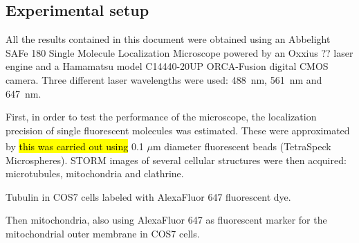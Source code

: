 \subsection{Experimental setup} \label{sec:experimental_setup}
All the results contained in this document were obtained using an Abbelight SAFe 180 Single Molecule Localization Microscope powered by an Oxxius ?? laser engine and a Hamamatsu model C14440-20UP ORCA-Fusion digital CMOS camera.
Three different laser wavelengths were used: \mbox{488 nm}, \mbox{561 nm} and \mbox{647 nm}.

First, in order to test the performance of the microscope, the localization precision of single fluorescent molecules was estimated.
These were approximated by \hl{this was carried out using} 0.1 $\mu$m diameter fluorescent beads (TetraSpeck\textsuperscript{\texttrademark} Microspheres).
STORM images of several cellular structures were then acquired:
microtubules, mitochondria and clathrine.

Tubulin in COS7 cells labeled with AlexaFluor 647 fluorescent dye.

Then mitochondria, also using AlexaFluor 647 as fluorescent marker for the mitochondrial outer membrane in COS7 cells.


